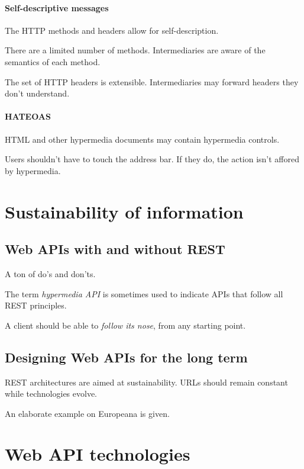 \documentclass{report}
\begin{document}
\paragraph{Self-descriptive messages}

The HTTP methods and headers allow for self-description.

There are a limited number of methods.
Intermediaries are aware of the semantics of each method.

The set of HTTP headers is extensible.
Intermediaries may forward headers they don't understand.

\paragraph{HATEOAS} 

HTML and other hypermedia documents
may contain hypermedia controls.

Users shouldn't have to touch the address bar.
If they do, the action isn't affored by hypermedia.

\section{Sustainability of information}

\subsection{Web APIs with and without REST}

A ton of do's and don'ts.

The term \emph{hypermedia API} is sometimes used
to indicate APIs that follow all REST principles.

A client should be able to \emph{follow its nose},
from any starting point.

\subsection{Designing Web APIs for the long term}

REST architectures are aimed at sustainability.
URLs should remain constant while technologies evolve.

An elaborate example on Europeana is given.

\section{Web API technologies}
\end{document}
